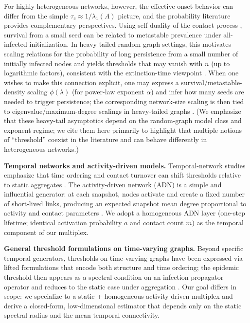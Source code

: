 \documentclass[pdflatex,sn-mathphys-num]{sn-jnl}%
\theoremstyle{thmstyleone}%
\theoremstyle{thmstyletwo}%
\theoremstyle{thmstylethree}%
\begin{document}
For highly heterogeneous networks, however, the effective onset behavior can differ from the simple $\tau_c\approx 1/\lambda_1(A)$ picture, and the probability literature provides complementary perspectives.
Using self-duality of the contact process \cite{liggett2013stochastic}, survival from a small seed can be related to metastable prevalence under all-infected initialization.
In heavy-tailed random-graph settings, this motivates scaling relations for the probability of long persistence from a small number of initially infected nodes and yields thresholds that may vanish with $n$ (up to logarithmic factors), consistent with the extinction-time viewpoint \cite{ChatterjeeDurrett2009,Mountford2013,mountford2016exponential,bhamidi2021survival}.
When one wishes to make this connection explicit, one may express a survival/metastable-density scaling $\phi(\lambda)$ (for power-law exponent $\alpha$) and infer how many seeds are needed to trigger persistence; the corresponding network-size scaling is then tied to eigenvalue/maximum-degree scalings in heavy-tailed graphs \cite{flaxman2005high,Chung2003}.
(We emphasize that these heavy-tail asymptotics depend on the random-graph model class and exponent regime; we cite them here primarily to highlight that multiple notions of ``threshold'' coexist in the literature and can behave differently in heterogeneous networks.)

\textbf{Temporal networks and activity-driven models.}
Temporal-network studies emphasize that time ordering and contact turnover can shift thresholds relative to static aggregates \cite{HolmeSaramaki2012}.
The activity-driven network (ADN) is a simple and influential generator: at each snapshot, nodes activate and create a fixed number of short-lived links, producing an expected snapshot mean degree proportional to activity and contact parameters \cite{Perra2012}.
We adopt a homogeneous ADN layer (one-step lifetime; identical activation probability $a$ and contact count $m$) as the temporal component of our multiplex.

\textbf{General threshold formulations on time-varying graphs.}
Beyond specific temporal generators, thresholds on time-varying graphs have been expressed via lifted formulations that encode both structure and time ordering; the epidemic threshold then appears as a spectral condition on an infection-propagator operator and reduces to the static case under aggregation \cite{Valdano2015}.
Our goal differs in scope: we specialize to a static + homogeneous activity-driven multiplex and derive a closed-form, low-dimensional estimator that depends only on the static spectral radius and the mean temporal connectivity.
\end{document}
